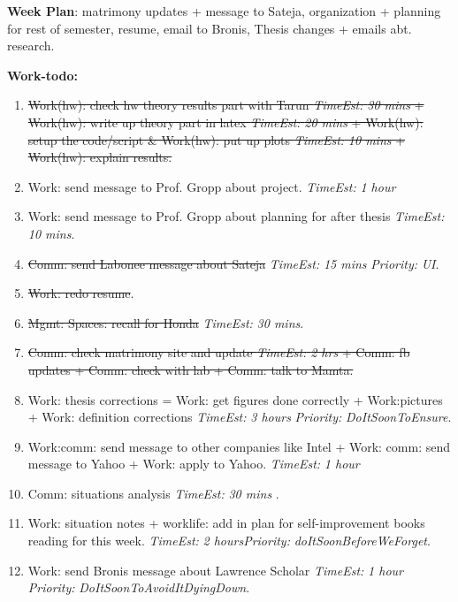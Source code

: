 \documentclass[11pt]{article}
\newcommand{\doneTask}[1]{\item \sout{\small #1}}
\newcommand{\te}[1]{\textit{TimeEst:} \textit{#1}}
\newcommand{\prio}[1]{\textit{Priority:} \textit{#1}}
\begin{document}

\textbf{Week Plan}: matrimony updates + message to Sateja,
organization + planning for rest of semester, resume, email to Bronis,
Thesis changes + emails abt. research. 

\textbf{Work-todo:}\\ 
\begin{enumerate} 
\doneTask{ Work(hw): check hw theory results part with Tarun \te{30
    mins} + Work(hw): write up theory part in latex \te{20 mins}
  + Work(hw): setup the code/script \& Work(hw): put up plots \te{10
    mins}  + Work(hw): explain results.}
\item Work: send message to Prof. Gropp about project. \te{1 hour}
\item Work: send message to Prof. Gropp about planning for after thesis \te{10 mins}. 
\doneTask{Comm: send Labonee message about Sateja} \te{15 mins} \prio{UI}. 
\doneTask{Work: redo resume}. 

\doneTask{ Mgmt: Spaces: recall for Honda}  \te{30 mins}.
\doneTask{Comm: check matrimony site and update \te{2 hrs}  + Comm: fb
  updates + Comm: check with lab + Comm: talk to Mamta. }


\item Work: thesis corrections = Work: get figures done correctly +
  Work:pictures + Work: definition corrections \te{3 hours}
  \prio{DoItSoonToEnsure}. 

\item Work:comm: send message to other companies like Intel  + Work:
  comm: send message to Yahoo + Work: apply to Yahoo. \te{1 hour} 

\item Comm: situations analysis \te{ 30 mins }. 

\item Work: situation notes + worklife: add in plan for
  self-improvement books reading for this week.  \te{2
    hours}\prio{doItSoonBeforeWeForget}. 

\item Work: send Bronis message about Lawrence Scholar \te{1 hour}
  \prio{DoItSoonToAvoidItDyingDown}. 


\end{enumerate}
\end{document}
